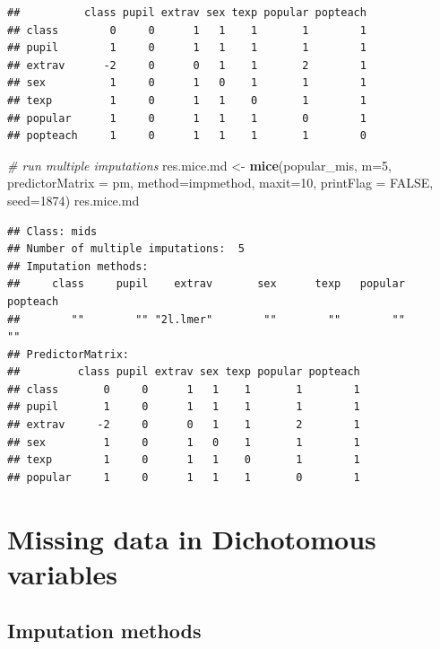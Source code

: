 \documentclass[
]{book}
\newenvironment{Shaded}{\begin{snugshade}}{\end{snugshade}}
\newcommand{\CommentTok}[1]{\textcolor[rgb]{0.56,0.35,0.01}{\textit{#1}}}
\newcommand{\DataTypeTok}[1]{\textcolor[rgb]{0.13,0.29,0.53}{#1}}
\newcommand{\DecValTok}[1]{\textcolor[rgb]{0.00,0.00,0.81}{#1}}
\newcommand{\KeywordTok}[1]{\textcolor[rgb]{0.13,0.29,0.53}{\textbf{#1}}}
\newcommand{\NormalTok}[1]{#1}
\newcommand{\OtherTok}[1]{\textcolor[rgb]{0.56,0.35,0.01}{#1}}
\newcommand{\StringTok}[1]{\textcolor[rgb]{0.31,0.60,0.02}{#1}}
\begin{document}
\begin{verbatim}
##          class pupil extrav sex texp popular popteach
## class        0     0      1   1    1       1        1
## pupil        1     0      1   1    1       1        1
## extrav      -2     0      0   1    1       2        1
## sex          1     0      1   0    1       1        1
## texp         1     0      1   1    0       1        1
## popular      1     0      1   1    1       0        1
## popteach     1     0      1   1    1       1        0
\end{verbatim}

\begin{Shaded}
\begin{Highlighting}[]
\CommentTok{# run multiple imputations}
\NormalTok{res.mice.md <-}\StringTok{ }\KeywordTok{mice}\NormalTok{(popular_mis, }\DataTypeTok{m=}\DecValTok{5}\NormalTok{, }\DataTypeTok{predictorMatrix =}\NormalTok{ pm,}
                    \DataTypeTok{method=}\NormalTok{impmethod, }\DataTypeTok{maxit=}\DecValTok{10}\NormalTok{, }\DataTypeTok{printFlag =} \OtherTok{FALSE}\NormalTok{, }\DataTypeTok{seed=}\DecValTok{1874}\NormalTok{)}
\NormalTok{res.mice.md}
\end{Highlighting}
\end{Shaded}

\begin{verbatim}
## Class: mids
## Number of multiple imputations:  5 
## Imputation methods:
##     class     pupil    extrav       sex      texp   popular  popteach 
##        ""        "" "2l.lmer"        ""        ""        ""        "" 
## PredictorMatrix:
##         class pupil extrav sex texp popular popteach
## class       0     0      1   1    1       1        1
## pupil       1     0      1   1    1       1        1
## extrav     -2     0      0   1    1       2        1
## sex         1     0      1   0    1       1        1
## texp        1     0      1   1    0       1        1
## popular     1     0      1   1    1       0        1
\end{verbatim}

\hypertarget{missing-data-in-dichotomous-variables}{%
\section{Missing data in Dichotomous variables}\label{missing-data-in-dichotomous-variables}}

\hypertarget{imputation-methods-1}{%
\subsection{Imputation methods}\label{imputation-methods-1}}
\end{document}
